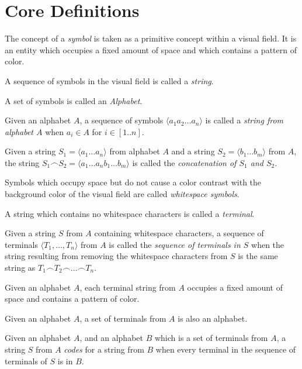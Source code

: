 \documentclass{article}
\newcommand{\nl}{\bigskip\noindent}
\newcommand{\seq}[1]{\langle #1\rangle}
\newcommand{\defcon}[1]{\emph{#1}}
\newcommand{\seqcat}{\frown}
\begin{document}
\section{Core Definitions}

\nl The concept of a \defcon{symbol} is taken as a primitive concept within a visual field.  It is an entity which occupies a fixed amount of space and which contains a pattern of color.  

\nl A sequence of symbols in the visual field is called a \defcon{string}.

\nl A set of symbols is called an \defcon{Alphabet}.

\nl Given an alphabet $A$, a sequence of symbols $\seq{a_1a_2\dots a_n}$  is called a \defcon{string from alphabet $A$}  when  $a_i\in A$ for $i\in[1..n]$.


\nl Given a string $S_1= \seq{a_1\dots a_n}$ from alphabet $A$ and a string $S_2 = \seq{b_1\dots b_m}$ from $A$, the string $S_1\seqcat S_2 = \seq{a_1\dots a_nb_1\dots b_m}$ is called the \defcon{concatenation of $S_1$ and $S_2$}.


\nl Symbols which occupy space but do not cause a color contrast with the background color of the visual field are called \defcon{whitespace symbols}.

\nl A string which contains no whitespace characters is called a \defcon{terminal}.

\nl Given a string $S$ from $A$ containing whitespace characters, a sequence of terminals $\seq{T_1,\dots, T_n}$ from $A$ is called the \defcon{sequence of terminals in $S$} when the string resulting from removing the whitespace characters from $S$ is the same string as $T_1\seqcat T_2\seqcat\dots \seqcat T_n$.

\nl Given an alphabet $A$, each terminal string from $A$ occupies a fixed amount of space and contains a pattern of color.   

\nl Given an alphabet $A$, a set of terminals from $A$ is also an alphabet. 


\nl Given an alphabet $A$, and an alphabet $B$ which is a set of terminals from $A$, a string $S$ from $A$ \defcon{codes} for a string from $B$ when every terminal in the sequence of terminals of $S$ is in $B$. 


 
\end{document}
